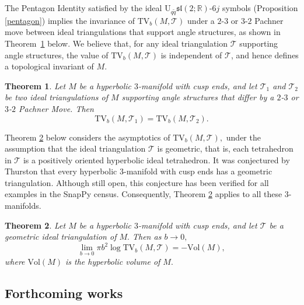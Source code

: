\documentclass[11pt]{article}
\newtheorem{theorem}{Theorem}[section]
\theoremstyle{remark}
\theoremstyle{remark}
\numberwithin{equation}{section}
\begin{document}
The Pentagon Identity satisfied by the ideal
$\mathrm{U}_{q\tilde q}\mathfrak{sl}(2;\mathbb R)$-$6j$ symbols (Proposition \ref{pentagon}) implies the
invariance of $\mathrm{TV}_b(M,\mathcal T)$ under a $2$-$3$ or $3$-$2$
Pachner move between ideal triangulations that support angle structures,
as shown in Theorem~\ref{topinv} below. We believe that, for any
ideal triangulation $\mathcal T$ supporting angle structures, the value
of $\mathrm{TV}_b(M,\mathcal T)$ is independent of $\mathcal T$, and
hence defines a topological invariant of $M$.

\begin{theorem}\label{topinv}
Let $M$ be a hyperbolic $3$-manifold with cusp ends, and let 
$\mathcal T_1$ and $\mathcal T_2$ be two ideal triangulations of $M$ supporting angle structures that differ by a $2$-$3$ or $3$-$2$ Pachner Move.  Then 
$$\mathrm{TV}_b(M,\mathcal T_1)=\mathrm{TV}_b(M,\mathcal T_2).$$
\end{theorem}


Theorem \ref{vol} below considers the asymptotics of $\mathrm{TV}_b(M,\mathcal T),$ under the assumption that the ideal triangulation $\mathcal T$ is geometric, that is, each tetrahedron in $\mathcal T$ is a positively oriented hyperbolic ideal tetrahedron. 
It was conjectured by Thurston that every hyperbolic $3$-manifold with cusp ends has a geometric triangulation. Although still open, this conjecture has been verified for all  examples in the SnapPy census. Consequently, Theorem \ref{vol} applies to all these $3$-manifolds. 


\begin{theorem}\label{vol}
Let $M$ be a hyperbolic $3$-manifold with cusp ends, and let $\mathcal T$ be a geometric ideal triangulation of $M.$ Then as $b\to 0,$
$$\lim_{b\to 0}\pi b^2\log \mathrm{TV}_b(M,\mathcal T)=-\mathrm{Vol}(M),$$
where $\mathrm{Vol}(M)$ is the hyperbolic volume of $M.$
\end{theorem}




\subsection{Forthcoming works}
\end{document}
